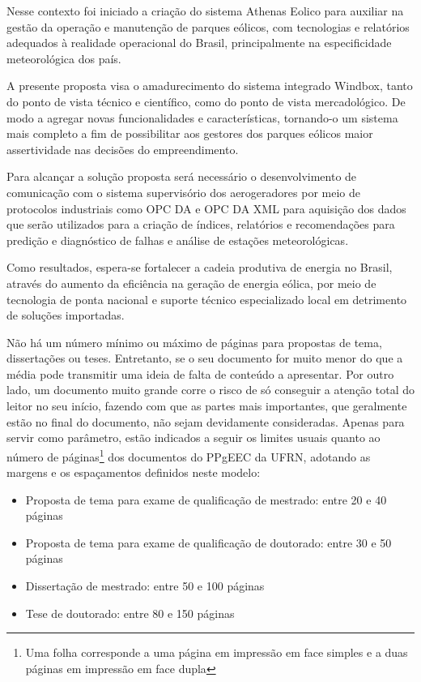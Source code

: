 Nesse contexto foi iniciado a criação do sistema  Athenas Eolico para auxiliar na gestão da operação e manutenção de parques eólicos, com tecnologias e relatórios adequados à realidade operacional do Brasil, principalmente na especificidade meteorológica dos país.

A presente proposta visa o amadurecimento do sistema integrado Windbox, tanto do ponto de vista técnico e científico, como do ponto de vista mercadológico. De modo a agregar novas funcionalidades e características, tornando-o um sistema mais completo a fim de possibilitar aos gestores dos parques eólicos maior assertividade nas decisões do empreendimento. 

Para alcançar a solução proposta será necessário o desenvolvimento de comunicação com o sistema supervisório dos aerogeradores por meio de protocolos industriais como OPC DA e OPC DA XML para aquisição dos dados que serão utilizados para a criação de índices, relatórios e recomendações para predição e diagnóstico de falhas e análise de estações meteorológicas.

Como resultados, espera-se fortalecer a cadeia produtiva de energia no Brasil, através do aumento da eficiência na geração de energia eólica, por meio de tecnologia de ponta nacional  e suporte técnico especializado local em detrimento de soluções importadas.



Não há um número mínimo ou máximo de páginas para propostas de tema,
dissertações ou teses. Entretanto, se o seu documento for muito menor
do que a média pode transmitir uma ideia de falta de conteúdo a
apresentar. Por outro lado, um documento muito grande corre o risco de
só conseguir a atenção total do leitor no seu início, fazendo com que
as partes mais importantes, que geralmente estão no final do
documento, não sejam devidamente consideradas. Apenas para servir como
parâmetro, estão indicados a seguir os limites usuais quanto ao número
de páginas\footnote{Uma folha corresponde a uma página em impressão em
face simples e a duas páginas em impressão em face dupla} dos
documentos do PPgEEC da UFRN, adotando as margens e os espaçamentos
definidos neste modelo:
\begin{itemize}
\item Proposta de tema para exame de qualificação de mestrado:
entre 20 e 40 páginas
\item Proposta de tema para exame de qualificação de doutorado:
entre 30 e 50 páginas
\item Dissertação de mestrado:
entre 50 e 100 páginas
\item Tese de doutorado:
entre 80 e 150 páginas
\end{itemize}

